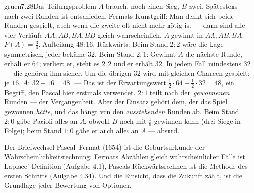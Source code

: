 \begin{loesungkarte}{gruen}{7.28}{Das Teilungsproblem}
$A$ braucht noch einen Sieg, $B$ zwei. Spätestens nach zwei Runden ist entschieden. Fermats Kunstgriff: Man denkt sich beide Runden gespielt, auch wenn die zweite oft nicht mehr nötig ist --- dann sind alle vier Verläufe $AA, AB, BA, BB$ gleich wahrscheinlich. $A$ gewinnt in $AA, AB, BA$: $P(A) = \frac34$. Aufteilung $48 : 16$.
Rückwärts: Beim Stand $2 : 2$ wäre die Lage symmetrisch, jeder bekäme $32$. Beim Stand $2 : 1$: Gewinnt $A$ die nächste Runde, erhält er $64$; verliert er, steht es $2 : 2$ und er erhält $32$. In jedem Fall mindestens $32$ --- die gehören ihm sicher. Um die übrigen $32$ wird mit gleichen Chancen gespielt: je $16$. $A$: $32 + 16 = 48$. --- Das ist der Erwartungswert $\frac12\cdot64 + \frac12\cdot32 = 48$, ein Begriff, den Pascal hier erstmals verwendet.
$2 : 1$ teilt nach den \emph{gewonnenen} Runden --- der Vergangenheit. Aber der Einsatz gehört dem, der das Spiel gewonnen \emph{hätte}, und das hängt von den \emph{ausstehenden} Runden ab. Beim Stand $2 : 0$ gäbe Pacioli alles an $A$, obwohl $B$ noch mit $\frac18$ gewinnen kann (drei Siege in Folge); beim Stand $1 : 0$ gäbe er auch alles an $A$ --- absurd.
\begin{mitnehmen}\kastentext
Der Briefwechsel Pascal--Fermat ($1654$) ist die Geburtsurkunde der Wahrscheinlichkeitsrechnung: Fermats Abzählen gleich wahrscheinlicher Fälle ist Laplace' Definition (Aufgabe 4.1), Pascals Rückwärtsrechnen ist die Methode des ersten Schritts (Aufgabe 4.34). Und die Einsicht, dass die Zukunft zählt, ist die Grundlage jeder Bewertung von Optionen.
\end{mitnehmen}
\end{loesungkarte}


